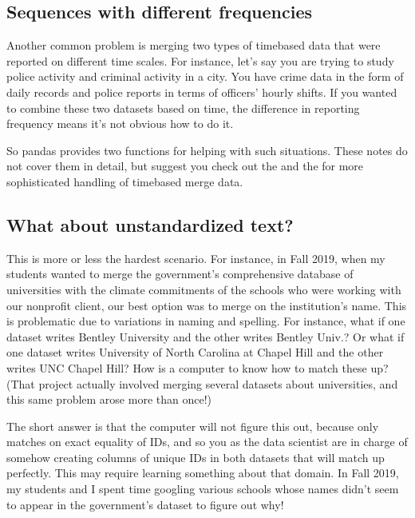 \documentclass[letterpaper,10pt,english]{jupyterBook}
\begin{document}
\subsection{Sequences with different frequencies}
\label{\detokenize{chapter-12-concat-and-merge:sequences-with-different-frequencies}}
\sphinxAtStartPar
Another common problem is merging two types of time\sphinxhyphen{}based data that were reported on different time scales.  For instance, let’s say you are trying to study police activity and criminal activity in a city.  You have crime data in the form of daily records and police reports in terms of officers’ hourly shifts.  If you wanted to combine these two datasets based on time, the difference in reporting frequency means it’s not obvious how to do it.

\sphinxAtStartPar
So pandas provides two functions for helping with such situations.  These notes do not cover them in detail, but suggest you check out the  and the  for more sophisticated handling of time\sphinxhyphen{}based merge data.


\subsection{What about unstandardized text?}
\label{\detokenize{chapter-12-concat-and-merge:what-about-unstandardized-text}}
\sphinxAtStartPar
This is more or less the hardest scenario.  For instance, in Fall 2019, when my students wanted to merge the government’s comprehensive database of universities with the climate commitments of the schools who were working with our nonprofit client, our best option was to merge on the institution’s name.  This is problematic due to variations in naming and spelling.  For instance, what if one dataset writes Bentley University and the other writes Bentley Univ.?  Or what if one dataset writes University of North Carolina at Chapel Hill and the other writes UNC Chapel Hill?  How is a computer to know how to match these up?  (That project actually involved merging several datasets about universities, and this same problem arose more than once!)

\sphinxAtStartPar
The short answer is that the computer will not figure this out, because  only matches on exact equality of IDs, and so you as the data scientist are in charge of somehow creating columns of unique IDs in both datasets that will match up perfectly.  This may require learning something about that domain.  In Fall 2019, my students and I spent time googling various schools whose names didn’t seem to appear in the government’s dataset to figure out why!
\end{document}
